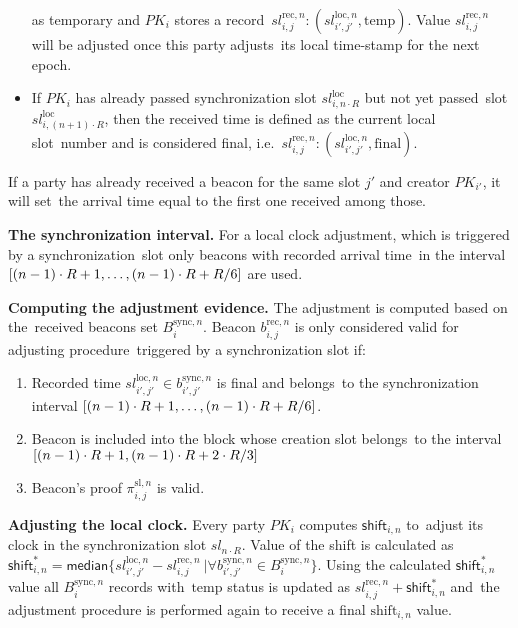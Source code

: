 \begin{legal}
\begin{itemize}
        as temporary and $PK_i$ stores a record\
        ${{sl^{\text{rec}, n}_{i, j}}: (sl_{i', j'}^{\text{loc}, n}, \text{temp})}$.
        Value ${{sl^{\text{rec}, n}_{i, j}}}$ will be adjusted once this party adjusts\
        its local time-stamp for the next epoch.
        \item If $PK_i$ has already passed synchronization slot $sl_{i, n \cdot R}^{\text{loc}}$ but not yet passed\
        slot $sl_{i, (n + 1) \cdot R}^{\text{loc}}$, then the received time is defined as the current local slot\
        number and is considered final, i.e.\
        ${{sl^{\text{rec}, n}_{i, j}}: (sl_{i', j'}^{\text{loc}, n}, \text{final})}$.
    \end{itemize}
    If a party has already received a beacon for the same slot $j'$ and creator $PK_{i'}$, it will set\
    the arrival time equal to the first one received among those.
    \item[]\textbf{The synchronization interval.} For a local clock adjustment, which is triggered by a synchronization\
    slot only beacons with recorded arrival time\
    in the interval ${[(n - 1) \cdot R + 1,\dots,(n-1) \cdot R + R \// 6]}$ are used.
    \item[]\textbf{Computing the adjustment evidence.} The adjustment is computed based on the\
    received beacons set $B_i^{\text{sync}, n}$.
    Beacon ${b^{\text{rec}, n}_{i, j}}$ is only considered valid for adjusting procedure\
    triggered by a synchronization slot if:
    \begin{enumerate}
        \item Recorded time ${sl_{i', j'}^{\text{loc}, n} \in b_{i', j'}^{\text{sync}, n}}$ is final and belongs\
        to the synchronization interval ${[(n - 1) \cdot R + 1,\dots,(n-1) \cdot R + R \// 6]}$.
        \item Beacon is included into the block whose creation slot belongs\
        to the interval ${[(n - 1) \cdot R + 1, (n - 1) \cdot R + 2 \cdot R \// 3]}$
        \item Beacon's proof $\pi_{i, j}^{\text{sl}, n}$ is valid.
    \end{enumerate}
    \item[]\textbf{Adjusting the local clock.} Every party $PK_i$ computes $\textsf{shift}_{i, n}$ to\
    adjust its clock in the synchronization slot $sl_{n \cdot R}$.
    Value of the shift is calculated as\
    ${\textsf{shift}^*_{i, n} = \textsf{median} \{sl_{i', j'}^{\text{loc}, n} - sl^{\text{rec}, n}_{i, j}\
    | \forall b_{i', j'}^{\text{sync}, n} \in B_i^{\text{sync}, n}\}}$.
    Using the calculated ${\textsf{shift}^*_{i, n}}$ value all $B_i^{\text{sync}, n}$ records with\
    $\text{temp}$ status is updated as ${sl^{\text{rec}, n}_{i, j} + \textsf{shift}^*_{i, n}}$ and\
    the adjustment procedure is performed again to receive a final $\text{shift}_{i, n}$ value.
\end{legal}


